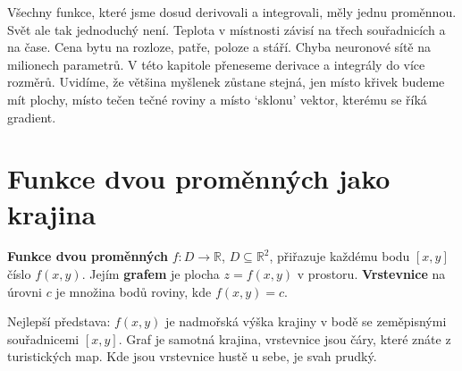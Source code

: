 \label{kap:vice-promennych}

Všechny funkce, které jsme dosud derivovali a integrovali, měly jednu proměnnou. Svět ale tak jednoduchý není. Teplota v místnosti závisí na třech souřadnicích a na čase. Cena bytu na rozloze, patře, poloze a stáří. Chyba neuronové sítě na milionech parametrů. V této kapitole přeneseme derivace a integrály do více rozměrů. Uvidíme, že většina myšlenek zůstane stejná, jen místo křivek budeme mít plochy, místo tečen tečné roviny a místo `sklonu' vektor, kterému se říká gradient.

\section{Funkce dvou proměnných jako krajina}

\begin{definitionbox}
  \textbf{Funkce dvou proměnných} $f\colon D\to\mathbb{R}$, $D\subseteq\mathbb{R}^2$, přiřazuje každému bodu $[x, y]$ číslo $f(x, y)$. Jejím \textbf{grafem} je plocha $z = f(x, y)$ v prostoru. \textbf{Vrstevnice} na úrovni $c$ je množina bodů roviny, kde $f(x, y) = c$.
\end{definitionbox}

Nejlepší představa: $f(x, y)$ je nadmořská výška krajiny v bodě se zeměpisnými souřadnicemi $[x, y]$. Graf je samotná krajina, vrstevnice jsou čáry, které znáte z turistických map. Kde jsou vrstevnice hustě u sebe, je svah prudký.

